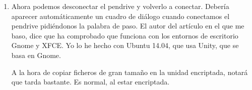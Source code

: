 \begin{enumerate}
  \item Ahora podemos desconectar el pendrive y volverlo a conectar. Debería aparecer automáticamente un cuadro
    de diálogo cuando conectamos el pendrive pidiéndonos la palabra de paso. El autor del artículo en el que me
    baso, dice que ha comprobado que funciona con los entornos de escritorio Gnome y XFCE. Yo lo he hecho con
    Ubuntu 14.04, que usa Unity, que se basa en Gnome.

    A la hora de copiar ficheros de gran tamaño en la unidad encriptada, notará que tarda bastante. Es normal,
    al estar encriptada.

\end{enumerate}

